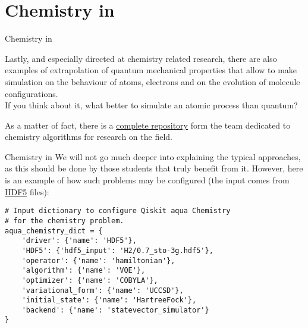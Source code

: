 \documentclass[aspectratio=43]{beamer}
\begin{document}
\section{Chemistry in \qka}
\begin{frame}{Chemistry in \qka}
\begin{card}
    Lastly, and especially directed at chemistry related research, there are also examples of extrapolation of quantum mechanical properties that allow to make simulation on the behaviour of atoms, electrons and on the evolution of molecule configurations.\\ If you think about it, what better to simulate an atomic process than quantum?
\end{card}
\begin{card}
    As a matter of fact, there is a \href{https://github.com/Qiskit/aqua-chemistry}{complete repository} form the \qk team dedicated to chemistry algorithms for research on the field.
\end{card}
\pagenumber
\end{frame}

\begin{frame}[fragile]{Chemistry in \qka}
\small{We will not go much deeper into explaining the typical approaches, as this should be done by those students that truly benefit from it. However, here is an example of how such problems may be configured (the input comes from \href{https://support.hdfgroup.org/HDF5/whatishdf5.html}{HDF5} files):}\begin{verbatim}
# Input dictionary to configure Qiskit aqua Chemistry
# for the chemistry problem.
aqua_chemistry_dict = {
    'driver': {'name': 'HDF5'},
    'HDF5': {'hdf5_input': 'H2/0.7_sto-3g.hdf5'},
    'operator': {'name': 'hamiltonian'},
    'algorithm': {'name': 'VQE'},
    'optimizer': {'name': 'COBYLA'},
    'variational_form': {'name': 'UCCSD'},
    'initial_state': {'name': 'HartreeFock'},
    'backend': {'name': 'statevector_simulator'}
}
\end{verbatim}
\end{frame}
\end{document}
